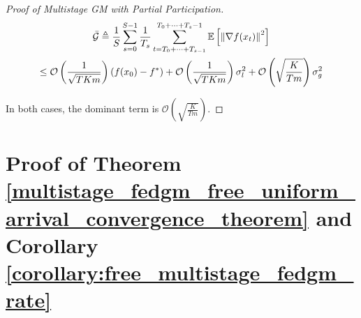 \begin{proof}[Proof of Multistage GM with Partial Participation]
\begin{equation}
\begin{gathered}
\Bar{\mathcal{G}}\triangleq\frac{1}{S}\sum_{s=0}^{S-1} \frac{1}{T_s}\sum_{t=T_0+\dots+T_{s-1} }^{T_0+\dots+T_s-1} \mathbb{E}\left[\left\|\nabla f(x_t)\right\|^2\right]\\
\leq  \mathcal{O}\left(\frac{1}{\sqrt{T K m}}\right) \left(f(x_0)-f^\ast\right) +   \mathcal{O}\left(\frac{1}{\sqrt{T K m}}\right)     \sigma_l^2 
+  \mathcal{O}\left( \sqrt{\frac{K}{T m}}  \right)   \sigma_g^2
\end{gathered}\nonumber
\end{equation}

In both cases, the dominant term is $\mathcal{O}\left( \sqrt{\frac{K}{T m}}  \right)$.


\end{proof}





\section{Proof of Theorem \ref{multistage_fedgm_free_uniform_arrival_convergence_theorem} and Corollary \ref{corollary:free_multistage_fedgm_rate}}
\label{sec:proof_free_multistage_fedgm_uniform_arrival}


